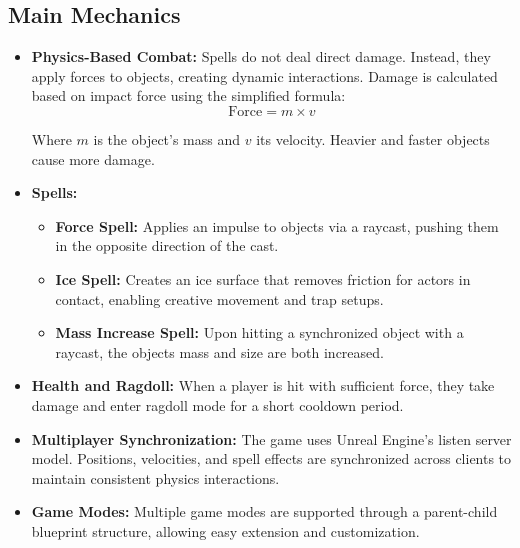 \documentclass[conference]{IEEEtran}
\begin{document}
    \subsection{Main Mechanics}\label{subsec:main-mechanics}
    \begin{itemize}
        \item \textbf{Physics-Based Combat:} Spells do not deal direct damage.
        Instead, they apply forces to objects, creating dynamic interactions.
        Damage is calculated based on impact force using the simplified formula:
        \begin{equation}
            \text{Force} = m \times v \label{eq:equation}
        \end{equation}

        Where \(m\) is the object's mass and \(v\) its velocity.
        Heavier and faster objects cause more damage.

        \item \textbf{Spells:}
        \begin{itemize}
            \item \textbf{Force Spell:} Applies an impulse to objects via a raycast, pushing them in the opposite direction of the cast.
            \item \textbf{Ice Spell:} Creates an ice surface that removes friction for actors in contact, enabling creative movement and trap setups.
            \item \textbf{Mass Increase Spell:} Upon hitting a synchronized object with a raycast, the objects mass and size are both increased.
        \end{itemize}

        \item \textbf{Health and Ragdoll:} When a player is hit with sufficient force, they take damage and enter ragdoll mode for a short cooldown period.

        \item \textbf{Multiplayer Synchronization:} The game uses Unreal Engine’s listen server model.
        Positions, velocities, and spell effects are synchronized across clients to maintain consistent physics interactions.

        \item \textbf{Game Modes:} Multiple game modes are supported through a parent-child blueprint structure, allowing easy extension and customization.


\end{itemize}
\end{document}
